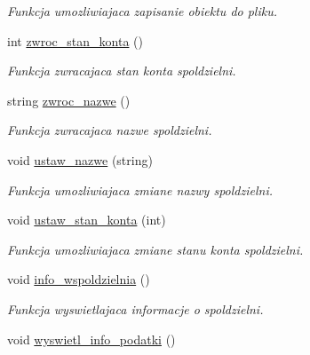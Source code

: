 \begin{DoxyCompactItemize}
\begin{DoxyCompactList}\small\item\em Funkcja umozliwiajaca zapisanie obiektu do pliku. \end{DoxyCompactList}\item 
int \hyperlink{class_zarzadanie__wspoldzielnia_a7ed866ff4292827140084bd79af5f9d4}{zwroc\+\_\+stan\+\_\+konta} ()
\begin{DoxyCompactList}\small\item\em Funkcja zwracajaca stan konta spoldzielni. \end{DoxyCompactList}\item 
string \hyperlink{class_zarzadanie__wspoldzielnia_a62b6b6ffa97c782a1dd80e27e77643ea}{zwroc\+\_\+nazwe} ()
\begin{DoxyCompactList}\small\item\em Funkcja zwracajaca nazwe spoldzielni. \end{DoxyCompactList}\item 
void \hyperlink{class_zarzadanie__wspoldzielnia_a82d8de3fca3742f0e6a64ce2826a3b0e}{ustaw\+\_\+nazwe} (string)
\begin{DoxyCompactList}\small\item\em Funkcja umozliwiajaca zmiane nazwy spoldzielni. \end{DoxyCompactList}\item 
void \hyperlink{class_zarzadanie__wspoldzielnia_ae6a070fc20c47a8f2326633c5febae26}{ustaw\+\_\+stan\+\_\+konta} (int)
\begin{DoxyCompactList}\small\item\em Funkcja umozliwiajaca zmiane stanu konta spoldzielni. \end{DoxyCompactList}\item 
\hypertarget{class_zarzadanie__wspoldzielnia_a23ef8e239cc5d8563f98bc902d279c0d}{}void \hyperlink{class_zarzadanie__wspoldzielnia_a23ef8e239cc5d8563f98bc902d279c0d}{info\+\_\+wspoldzielnia} ()\label{class_zarzadanie__wspoldzielnia_a23ef8e239cc5d8563f98bc902d279c0d}

\begin{DoxyCompactList}\small\item\em Funkcja wyswietlajaca informacje o spoldzielni. \end{DoxyCompactList}\item 
\hypertarget{class_zarzadanie__wspoldzielnia_a8d5375db39f4591fd467eb370ff15338}{}void \hyperlink{class_zarzadanie__wspoldzielnia_a8d5375db39f4591fd467eb370ff15338}{wyswietl\+\_\+info\+\_\+podatki} ()\label{class_zarzadanie__wspoldzielnia_a8d5375db39f4591fd467eb370ff15338}


\end{DoxyCompactItemize}
